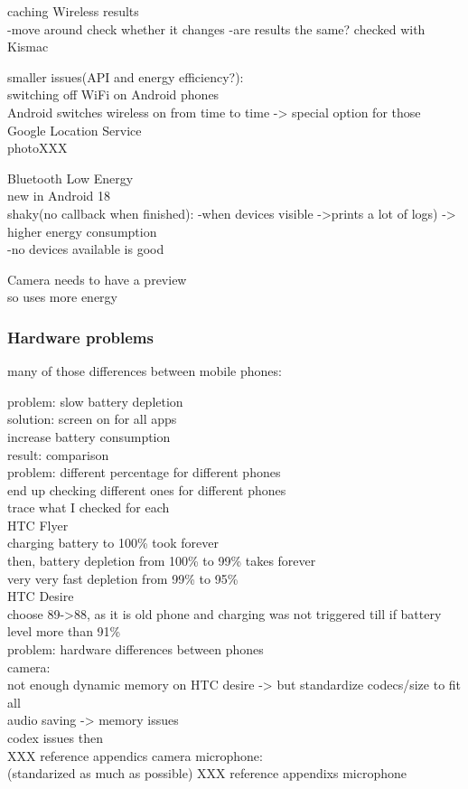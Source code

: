 				
	caching Wireless results\\
		-move around check whether it changes
			-are results the same?
		checked with Kismac

smaller issues(API and energy efficiency?):\\
	switching off WiFi on Android phones\\
		Android switches wireless on from time to time -> special option for those \\
			Google Location Service\\
			photoXXX
			
	Bluetooth Low Energy\\
		new in Android 18\\
		shaky(no callback when finished):
			-when devices visible ->prints a lot of logs) -> higher energy consumption\\
			-no devices available is good
		
	Camera needs to have a preview\\
		so uses more energy\\
		
\subsubsection{Hardware problems}
many of those differences between mobile phones:	

problem: slow battery depletion\\
	solution: screen on for all apps\\
		increase battery consumption\\
	result: comparison\\
	
problem: different percentage for different phones\\
	end up checking different ones for different phones\\
		trace what I checked for each\\
		HTC Flyer\\
			charging battery to 100\% took forever\\
			then, battery depletion from 100\% to 99\% takes forever\\
			very very fast depletion from 99\% to 95\%\\
		HTC Desire\\
			choose 89->88, as it is old phone and charging was not triggered till if battery level more than 91\%\\
		
problem: hardware differences between phones\\
	camera:\\
		not enough dynamic memory on HTC desire -> but standardize codecs/size to fit all\\
		audio saving -> memory issues\\
			codex issues then\\
			XXX reference appendics camera
	microphone:\\
		(standarized as much as possible)
		XXX reference appendixs microphone
			
